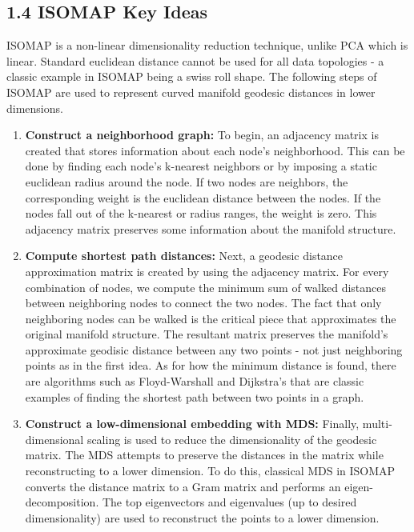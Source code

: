\documentclass[twoside,10pt]{article}
\begin{document}
\begin{enumerate}
\subsection*{1.4 ISOMAP Key Ideas}
ISOMAP is a non-linear dimensionality reduction technique, unlike PCA which is linear. Standard euclidean distance cannot be used for all data topologies - a classic example in ISOMAP being a swiss roll shape. The following steps of ISOMAP are used to represent curved manifold geodesic distances in lower dimensions.
\begin{enumerate}
    \item \textbf{Construct a neighborhood graph:} To begin, an adjacency matrix is created that stores information about each node's neighborhood. This can be done by finding each node's k-nearest neighbors or by imposing a static euclidean radius around the node. If two nodes are neighbors, the corresponding weight is the euclidean distance between the nodes. If the nodes fall out of the k-nearest or radius ranges, the weight is zero. This adjacency matrix preserves some information about the manifold structure.

    \item \textbf{Compute shortest path distances:} Next, a geodesic distance approximation matrix is created by using the adjacency matrix. For every combination of nodes, we compute the minimum sum of walked distances between neighboring nodes to connect the two nodes. The fact that only neighboring nodes can be walked is the critical piece that approximates the original manifold structure. The resultant matrix preserves the manifold's approximate geodisic distance between any two points - not just neighboring points as in the first idea. As for how the minimum distance is found, there are algorithms such as Floyd-Warshall and Dijkstra's that are classic examples of finding the shortest path between two points in a graph.

    \item \textbf{Construct a low-dimensional embedding with MDS:} Finally, multi-dimensional scaling is used to reduce the dimensionality of the geodesic matrix. The MDS attempts to preserve the distances in the matrix while reconstructing to a lower dimension. To do this, classical MDS in ISOMAP converts the distance matrix to a Gram matrix and performs an eigen-decomposition. The top eigenvectors and eigenvalues (up to desired dimensionality) are used to reconstruct the points to a lower dimension.
\end{enumerate}


\end{enumerate}
\end{document}
